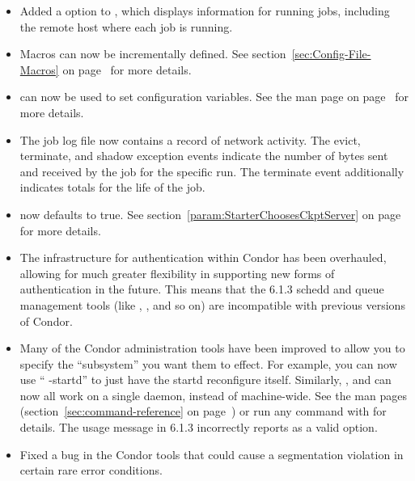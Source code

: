 \begin{itemize}
\item Added a  option to , which displays
information for running jobs, including the remote host where each job
is running.

\item Macros can now be incrementally defined.  See
section~\ref{sec:Config-File-Macros} on
page~\pageref{sec:Config-File-Macros} for more details.

\item {} can now be used to set configuration
variables.  See the man page on page~\pageref{man-condor-config-val}
for more details.

\item The job log file now contains a record of network activity.  The
evict, terminate, and shadow exception events indicate the number of
bytes sent and received by the job for the specific run.  
The terminate event additionally indicates totals for the life of the
job.

\item {} now defaults to true.
See section~\ref{param:StarterChoosesCkptServer} on
page~\pageref{param:StarterChoosesCkptServer} for more details.

\item The infrastructure for authentication within Condor has been
overhauled, allowing for much greater flexibility in supporting new
forms of authentication in the future.
This means that the 6.1.3 schedd and queue management tools (like
, ,  and so on) are incompatible
with previous versions of Condor.

\item Many of the Condor administration tools have been improved to
allow you to specify the ``subsystem'' you want them to effect.  
For example, you can now use `` -startd'' to just
have the startd reconfigure itself.
Similarly, ,  and  can now all 
work on a single daemon, instead of machine-wide.
See the man pages (section~\ref{sec:command-reference} on
page~\pageref{sec:command-reference}) or run any command with 
for details. 
\Note The usage message in 6.1.3 incorrectly reports  as a
valid option.

\item Fixed a bug in the Condor tools that could cause a segmentation
violation in certain rare error conditions.

\end{itemize}

